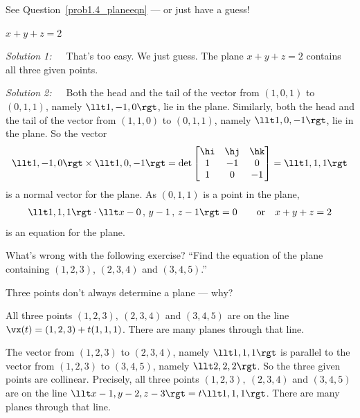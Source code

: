 \begin{hint}
See Question~\ref{prob1.4_planeeqn} --- or just have a guess!
\end{hint}

\begin{answer}
$x+y+z=2$
\end{answer}

\begin{solution}
\emph{Solution 1:}\ \ \ That's too easy. We just guess.
The plane $x+y+z=2$ contains all three given points.

\emph{Solution 2:}\ \ \ 
Both the head and the tail of the vector from $(1,0,1)$ to $(0,1,1)$,
namely $\llt 1,-1,0\rgt$, lie in the plane. Similarly, 
both the head and the tail of the vector from $(1,1,0)$ to $(0,1,1)$,
namely $\llt 1,0,-1\rgt$, lie in the plane. So the vector
\begin{align*}
\llt 1,-1,0\rgt \times \llt 1,0,-1\rgt
=\det\left[\begin{matrix}
           \hi & \hj & \hk \\
           1  &  -1  &  0 \\
           1  &  0  &  -1
  \end{matrix}\right]
=\llt 1 , 1 ,1  \rgt
\end{align*}
is a normal vector for the plane. As $(0,1,1)$ is a point in the plane,
\begin{align*}
\llt 1 , 1 ,1 \rgt \cdot \llt x-0\,,\,y-1\,,\, z-1 \rgt = 0\qquad
\text{or}\quad
x+y+z=2
\end{align*}
is an equation for the plane.
\end{solution}

\begin{question}
 What's wrong with the following exercise? ``Find the equation of the plane
containing $(1,2,3)$, $(2,3,4)$ and $(3,4,5)$.''
\end{question}

\begin{hint}
Three points don't always determine a plane --- why?
\end{hint}

\begin{answer}
 All three points $(1,2,3),\ (2,3,4)$ and $(3,4,5)$
are on the line $\vx(t)=(1,2,3)+t(1,1,1)$. There are many planes
through that line.
\end{answer}

\begin{solution}
The vector from $(1,2,3)$ to $(2,3,4)$, namely $\llt 1,1,1\rgt$
is parallel to the vector from $(1,2,3)$ to $(3,4,5)$, namely
$\llt 2,2,2\rgt$. So the three given points are collinear. Precisely,
 all three points $(1,2,3),\ (2,3,4)$ and $(3,4,5)$
are on the line $\llt x-1,y-2,z-3\rgt=t\llt 1,1,1\rgt$. There are many planes
through that line.
\end{solution}



